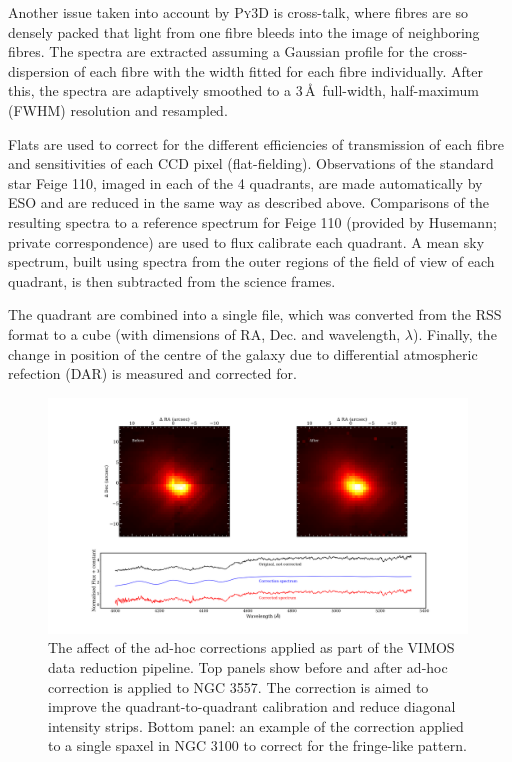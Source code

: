 		Another issue taken into account by \textsc{Py3D} is cross-talk, where fibres are so densely packed that light from one fibre bleeds into the image of neighboring fibres. The spectra are extracted assuming a Gaussian profile for the cross-dispersion of each fibre with the width fitted for each fibre individually. After this, the spectra are adaptively smoothed to a 3\,\AA\ full-width, half-maximum (FWHM) resolution and resampled.

		Flats are used to correct for the different efficiencies of transmission of each fibre and sensitivities of each CCD pixel (flat-fielding). Observations of the standard star Feige 110, imaged in each of the 4 quadrants, are made automatically by ESO and are reduced in the same way as described above. Comparisons of the resulting spectra to a reference spectrum for Feige 110 (provided by Husemann; private correspondence) are used to flux calibrate each quadrant. A mean sky spectrum, built using spectra from the outer regions of the field of view of each quadrant, is then subtracted from the science frames. 

		The quadrant are combined into a single file, which was converted from the RSS format to a cube (with dimensions of RA, Dec. and wavelength, $\lambda$). Finally, the change in position of the centre of the galaxy due to differential atmospheric refection (DAR) is measured and corrected for. 

		\begin{figure}
			\centering
			\includegraphics[width=0.99\textwidth]{chapter2/corr_image.png}
			\caption[Ad-hoc correction to VIMOS datacubes]{The affect of the ad-hoc corrections applied as part of the VIMOS data reduction pipeline. Top panels show before and after ad-hoc correction is applied to NGC 3557. The correction is aimed to improve the quadrant-to-quadrant calibration and reduce diagonal intensity strips. Bottom panel: an example of the correction applied to a single spaxel in NGC 3100 to correct for the fringe-like pattern.}
			\label{fig:Correction}
		\end{figure}

